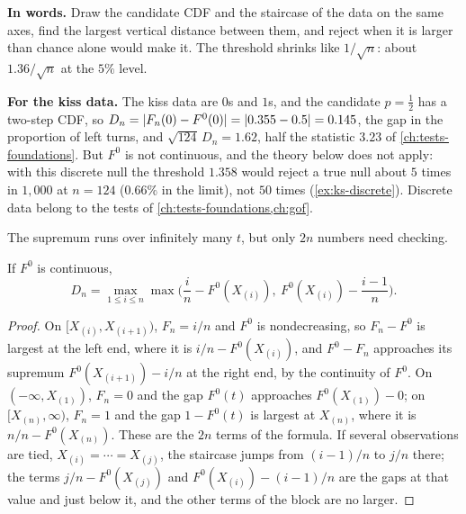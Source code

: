 \begin{inwords}
\textbf{In words.} Draw the candidate CDF and the staircase of the data on the same axes, find the largest vertical distance between them, and reject when it is larger than chance alone would make it. The threshold shrinks like $1/\sqrt{n}$: about $1.36/\sqrt{n}$ at the $5\%$ level.
\par\smallskip
\textbf{For the kiss data.} The kiss data are $0$s and $1$s, and the candidate $p = \frac12$ has a two-step CDF, so $D_n = \lvert F_n(0) - F^0(0)\rvert = \lvert0.355 - 0.5\rvert = 0.145$, the gap in the proportion of left turns, and $\sqrt{124}\,D_n = 1.62$, half the statistic $3.23$ of \cref{ch:tests-foundations}. But $F^0$ is not continuous, and the theory below does not apply: with this discrete null the threshold $1.358$ would reject a true null about $5$ times in $1{,}000$ at $n = 124$ ($0.66\%$ in the limit), not $50$ times (\cref{ex:ks-discrete}). Discrete data belong to the tests of \cref{ch:tests-foundations,ch:gof}.
\end{inwords}

The supremum runs over infinitely many $t$, but only $2n$ numbers need checking.

\begin{proposition}
\label{prop:ks-compute}
If $F^0$ is continuous,
\[
D_n = \max_{1 \leq i \leq n}\max\Big(\frac{i}{n} - F^0(X_{(i)}),\ F^0(X_{(i)}) - \frac{i - 1}{n}\Big).
\]
\end{proposition}

\begin{proof}
On $[X_{(i)}, X_{(i+1)})$, $F_n = i/n$ and $F^0$ is nondecreasing, so $F_n - F^0$ is largest at the left end, where it is $i/n - F^0(X_{(i)})$, and $F^0 - F_n$ approaches its supremum $F^0(X_{(i+1)}) - i/n$ at the right end, by the continuity of $F^0$.
On $(-\infty, X_{(1)})$, $F_n = 0$ and the gap $F^0(t)$ approaches $F^0(X_{(1)}) - 0$; on $[X_{(n)}, \infty)$, $F_n = 1$ and the gap $1 - F^0(t)$ is largest at $X_{(n)}$, where it is $n/n - F^0(X_{(n)})$.
These are the $2n$ terms of the formula.
If several observations are tied, $X_{(i)} = \cdots = X_{(j)}$, the staircase jumps from $(i - 1)/n$ to $j/n$ there; the terms $j/n - F^0(X_{(j)})$ and $F^0(X_{(i)}) - (i - 1)/n$ are the gaps at that value and just below it, and the other terms of the block are no larger.
\end{proof}

